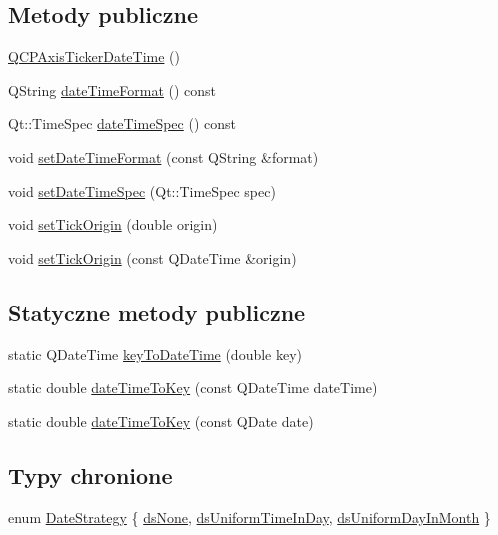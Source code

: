 \subsection*{Metody publiczne}
\begin{DoxyCompactItemize}
\item 
\hyperlink{class_q_c_p_axis_ticker_date_time_a84cc5c6bbc7c99c1f9bd4b3a392e1b9d}{Q\+C\+P\+Axis\+Ticker\+Date\+Time} ()
\item 
Q\+String \hyperlink{class_q_c_p_axis_ticker_date_time_a19d4302f3d58b5c05e7e943c6e7c5b57}{date\+Time\+Format} () const 
\item 
Qt\+::\+Time\+Spec \hyperlink{class_q_c_p_axis_ticker_date_time_a231ff3f1e970255bf874b50fd742ff18}{date\+Time\+Spec} () const 
\item 
void \hyperlink{class_q_c_p_axis_ticker_date_time_ad52660a82f688395468674d555f6a86b}{set\+Date\+Time\+Format} (const Q\+String \&format)
\item 
void \hyperlink{class_q_c_p_axis_ticker_date_time_afbd987c7197e42ab61e67fb1c38abebc}{set\+Date\+Time\+Spec} (Qt\+::\+Time\+Spec spec)
\item 
void \hyperlink{class_q_c_p_axis_ticker_date_time_a5388e048cbd32cf1ba730b9f1859eb5c}{set\+Tick\+Origin} (double origin)
\item 
void \hyperlink{class_q_c_p_axis_ticker_date_time_a2ea905872b8171847a49a5e093fb0c48}{set\+Tick\+Origin} (const Q\+Date\+Time \&origin)
\end{DoxyCompactItemize}
\subsection*{Statyczne metody publiczne}
\begin{DoxyCompactItemize}
\item 
static Q\+Date\+Time \hyperlink{class_q_c_p_axis_ticker_date_time_a4c1761ad057f5564804a53f942629b53}{key\+To\+Date\+Time} (double key)
\item 
static double \hyperlink{class_q_c_p_axis_ticker_date_time_aa24f293f16fff0f937bf71f4140033f1}{date\+Time\+To\+Key} (const Q\+Date\+Time date\+Time)
\item 
static double \hyperlink{class_q_c_p_axis_ticker_date_time_ad87afc7dba65843f68da5ca88bc004f4}{date\+Time\+To\+Key} (const Q\+Date date)
\end{DoxyCompactItemize}
\subsection*{Typy chronione}
\begin{DoxyCompactItemize}
\item 
enum \hyperlink{class_q_c_p_axis_ticker_date_time_af2c7c60821a6234ca7a172f42ef7f1d8}{Date\+Strategy} \{ \hyperlink{class_q_c_p_axis_ticker_date_time_af2c7c60821a6234ca7a172f42ef7f1d8a02076ab726129e1ab9e0f999d4314309}{ds\+None}, 
\hyperlink{class_q_c_p_axis_ticker_date_time_af2c7c60821a6234ca7a172f42ef7f1d8a39644957223102224f35662da3ab1a14}{ds\+Uniform\+Time\+In\+Day}, 
\hyperlink{class_q_c_p_axis_ticker_date_time_af2c7c60821a6234ca7a172f42ef7f1d8a7889e1531db9ce1c5d8957b4f0de58ad}{ds\+Uniform\+Day\+In\+Month}
 \}
\end{DoxyCompactItemize}
